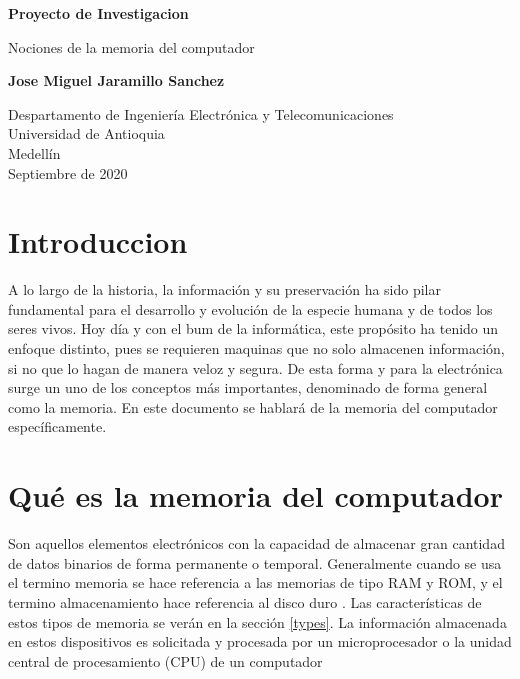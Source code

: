 \documentclass{article}
\begin{document}
\begin{titlepage}
    \begin{center}
        \vspace*{1cm}
            
        \Huge
        \textbf{Proyecto de Investigacion}
            
        \vspace{0.5cm}
        \LARGE
        Nociones de la memoria del computador
            
        \vspace{1.5cm}
            
        \textbf{Jose Miguel Jaramillo Sanchez}
            
        \vfill
            
        \vspace{0.8cm}
            
        \Large
        Despartamento de Ingeniería Electrónica y Telecomunicaciones\\
        Universidad de Antioquia\\
        Medellín\\
        Septiembre de 2020
            
    \end{center}
\end{titlepage}

\tableofcontents
\newpage
\section{Introduccion}
A lo largo de la historia, la información y su preservación ha sido pilar fundamental para el desarrollo y evolución de la especie humana y de todos los seres vivos. Hoy día y con el bum de la informática, este propósito ha tenido un enfoque distinto, pues se requieren maquinas que no solo almacenen información, si no que lo hagan de manera veloz y segura. De esta forma y para la electrónica surge un uno de los conceptos más importantes, denominado de forma general como la memoria. En este documento se hablará de la memoria del computador específicamente.

\section{Qué es la memoria del computador}
Son aquellos elementos electrónicos con la capacidad de almacenar gran cantidad de datos binarios de forma permanente o temporal. Generalmente cuando se usa el termino memoria se hace referencia a las memorias de tipo RAM y ROM, y el termino almacenamiento hace referencia al disco duro \cite{thomas}. Las características de estos tipos de memoria se verán en la sección \ref{types}. La información almacenada en estos dispositivos es solicitada y procesada por un microprocesador o la unidad central de procesamiento (CPU) de un computador
\end{document}
